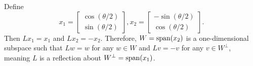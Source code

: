 \documentclass{article}
\begin{document}
\bigskip
\par
\begin{prob}
\end{prob}
Define
\[ x_1 = \begin{bmatrix}
    \cos (\theta / 2) \\
    \sin (\theta / 2)
\end{bmatrix}, x_2 = \begin{bmatrix}
- \sin (\theta / 2) \\
\cos (\theta / 2)
\end{bmatrix}. \]
Then $Lx_1=x_1$ and $Lx_2=-x_2$. Therefore, $W=\operatorname{span}(x_2)$ is a one-dimensional subspace such that $Lw=w$ for any $w \in W$ and $Lv=-v$ for any $v \in W^\perp$, meaning $L$ is a reflection about $W^\perp=\operatorname{span}(x_1)$.


\bigskip
\par
\begin{prob}
\end{prob}
\end{document}
